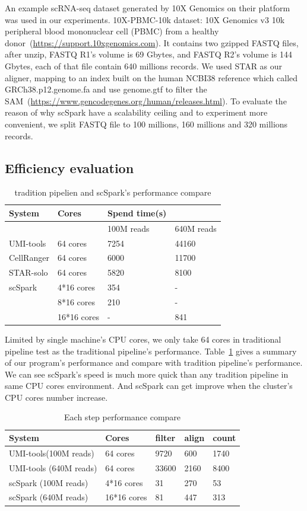 \documentclass[conference]{IEEEtran}
\begin{document}
An example scRNA-seq dataset generated by 10X Genomics on their platform was used in our experiments.
10X-PBMC-10k dataset: 10X Genomics v3 10k peripheral blood mononuclear cell (PBMC) from a healthy donor~(\url{https://support.10xgenomics.com}). 
It contains two gzipped FASTQ files, after unzip, FASTQ R1's volume is 69 Gbytes, and FASTQ R2's volume is 144 Gbytes, each of that file contain 640 millions records.
We used STAR as our aligner, mapping to an index built on the human NCBI38 reference which called GRCh38.p12.genome.fa and use genome.gtf to filter the SAM~(\url{https://www.gencodegenes.org/human/releases.html}).
To evaluate the reason of why scSpark have a scalability ceiling and to experiment more convenient, we split FASTQ file to 100 millions, 160 millions and 320 millions records. 

\subsection{Efficiency evaluation}
\begin{table}
  \centering
  \caption{tradition pipelien and scSpark's performance compare}\label{tab1}
  \begin{tabular}{|l | l | l  l|}
  \hline
  System &  Cores & Spend time(s) \\
  \hline
   &  & 100M reads & 640M reads \\
  \hline
  UMI-tools & 64 cores & 7254 & 44160 \\
  \hline
  CellRanger & 64 cores & 6000 & 11700 \\
  \hline
  STAR-solo & 64 cores &  5820 & 8100 \\
  \hline
  scSpark & 4*16 cores & 354 & - \\
   & 8*16 cores & 210 & - \\
   & 16*16 cores & - & 841 \\
  \hline
  \end{tabular}
\end{table}
Limited by single machine's CPU cores, we only take 64 cores in traditional pipeline test as the traditional pipeline's performance.
Table~\ref{tab1} gives a summary of our program's performance and compare with tradition pipeline's performance.
We can see scSpark's speed is much more quick than any tradition pipeline in same CPU cores environment.
And scSpark can get improve when the cluster's CPU cores number increase.
\begin{table}
  \centering
  \caption{Each step performance compare}\label{tab2}
  \begin{tabular}{|l | l | l | l | l|}
  \hline
  System & Cores & filter & align & count \\
  \hline
  UMI-tools(100M reads) & 64 cores & 9720 & 600 & 1740 \\
  \hline
  UMI-tools (640M reads) & 64 cores & 33600 & 2160 & 8400 \\
  \hline
  scSpark (100M reads) & 4*16 cores & 31 & 270 & 53 \\
  \hline
  scSpark (640M reads) & 16*16 cores & 81 & 447 & 313 \\
  \hline
  \end{tabular}
\end{table}
\end{document}
